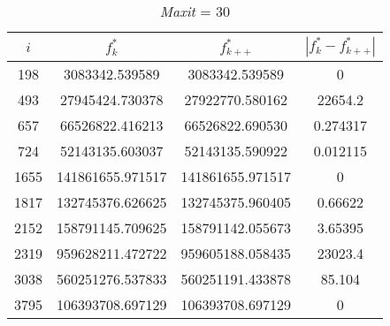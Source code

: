 \documentclass[12pt,a4paper,oneside,hidelinks]{report}
\begin{document}
\begin{table}[ht]
\begin{subtable}{\textwidth}
\begin{tabular}{|S[table-parse-only = true]
						|S[table-format = 9.6, table-number-alignment = center]
						|S[table-format = 9.6, table-number-alignment = center]
						|S[table-parse-only = true]|}
			\hline			
			{$i$} & {$f_{k}^*$} & {$f_{k++}^*$} & {$|f_{k}^* - f_{k++}^*|$} \\			
			
			\hline	
			
			198  &  3083342.539589   & 3083342.539589   & 0  \\
			493  &  27945424.730378  & 27922770.580162  & 22654.2 \\
			657  &  66526822.416213  & 66526822.690530  & 0.274317 \\
			724  &  52143135.603037  & 52143135.590922  & 0.012115\\
			1655 &  141861655.971517 & 141861655.971517 & 0 \\
			1817 &  132745376.626625 & 132745375.960405 & 0.66622 \\
			2152 &	158791145.709625 & 158791142.055673 & 3.65395 \\
			2319 &  959628211.472722 & 959605188.058435 & 23023.4 \\
			3038 &  560251276.537833 & 560251191.433878 & 85.104 \\
			3795 &  106393708.697129 & 106393708.697129 & 0 \\			
			
			\hline
		\end{tabular}
		
		\vspace*{0.4 cm}
		\caption{\textit{Maxit} = 30}
	\end{subtable}%
\end{table}

\vspace*{\fill}

\clearpage
\end{document}
